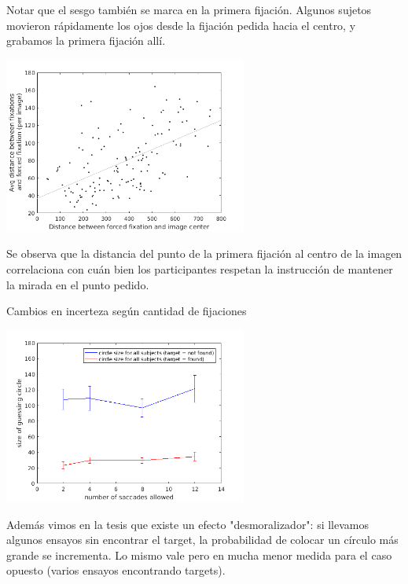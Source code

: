 \documentclass[compress]{beamer}
\begin{document}
\begin{frame}
Notar que el sesgo también se marca en la primera fijación. Algunos sujetos movieron rápidamente los ojos desde la fijación pedida hacia el centro, y grabamos la primera fijación allí.

\begin{center}
\includegraphics[width=0.6\textwidth]{images/scatter-first-fixation.png}
\end{center}

\bigskip

Se observa que la distancia del punto de la primera fijación al centro de la imagen correlaciona con cuán bien los participantes respetan la instrucción de mantener la mirada en el punto pedido.
\end{frame}

\begin{frame}{Cambios en incerteza según cantidad de fijaciones}
\begin{center}
\includegraphics[width=0.6\textwidth]{images/mean_circle_size.png}
\end{center}

Además vimos en la tesis que existe un efecto "desmoralizador": si llevamos algunos ensayos sin encontrar el target, la probabilidad de colocar un círculo más grande se incrementa. Lo mismo vale pero en mucha menor medida para el caso opuesto (varios ensayos encontrando targets).
\end{frame}
\end{document}
